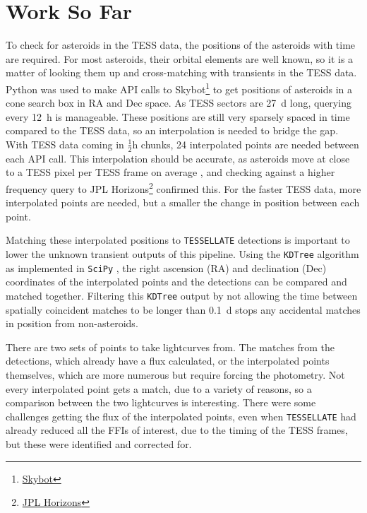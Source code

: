 \documentclass[12pt]{article}
\begin{document}
\section{Work So Far}

To check for asteroids in the TESS data, the positions of the asteroids with time are required.
For most asteroids, their orbital elements are well known, so it is a matter of looking them up and cross-matching with transients in the TESS data.
Python was used to make API calls to {Skybot}\footnote{\href{https://vo.imcce.fr/webservices/skybot/}{Skybot}} to get positions of asteroids in a cone search box in RA and Dec space.
As TESS sectors are \qty{27}{\day} long, querying every \qty{12}{\hour} is manageable.
These positions are still very sparsely spaced in time compared to the TESS data, so an interpolation is needed to bridge the gap.
With TESS data coming in $\frac12\unit{\hour}$ chunks, 24 interpolated points are needed between each API call.
This interpolation should be accurate, as asteroids move at close to a TESS pixel per TESS frame on average \citep{Pal2018,Pal2020}, and checking against a higher frequency query to {JPL Horizons}\footnote{\href{https://ssd.jpl.nasa.gov/horizons/}{JPL Horizons}} confirmed this.
For the faster TESS data, more interpolated points are needed, but a smaller the change in position between each point.

Matching these interpolated positions to \texttt{TESSELLATE} detections is important to lower the unknown transient outputs of this pipeline. 
Using the \texttt{KDTree} algorithm \citep{Maneewongvatana1999} as implemented in \texttt{SciPy} \citep{2020SciPy-NMeth}, the right ascension (RA) and  declination (Dec) coordinates of the interpolated points and the detections can be compared and matched together. 
Filtering this \texttt{KDTree} output by not allowing the time between spatially coincident matches to be longer than \qty{0.1}{\day} stops any accidental matches in position from non-asteroids. 

There are two sets of points to take lightcurves from. 
The matches from the detections, which already have a flux calculated, or the interpolated points themselves, which are more numerous but require forcing the photometry. 
Not every interpolated point gets a match, due to a variety of reasons, %
so a comparison between the two lightcurves is interesting. 
There were some challenges getting the flux of the interpolated points, even when \texttt{TESSELLATE} had already reduced all the FFIs of interest, due to the timing of the TESS frames, but these were identified and corrected for.
\end{document}
